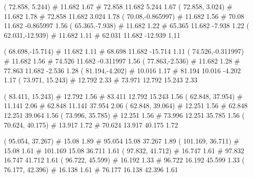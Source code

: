 \documentclass[a4paper,openbib,10pt]{article}
\newenvironment{treegraph}{\begin{graph}}{\end{graph}}
\begin{document}
\begin{treegraph}
  ( 72.858, 5.244) #     11.682    1.67
   #    72.858    11.682    5.244    1.67
  ( 72.858, 3.024) #     11.682    1.78
   #    72.858    11.682    3.024    1.78
  ( 70.08,-0.865997) #     11.682    1.56
   #    70.08    11.682    -0.865997    1.56
  ( 65.365,-7.938) #     11.682    1.22
   #    65.365    11.682    -7.938    1.22
  ( 62.031,-12.939) #     11.682    1.11
   #    62.031    11.682    -12.939    1.11

  ( 68.698,-15.714) #     11.682    1.11
   #    68.698    11.682    -15.714    1.11
  ( 74.526,-0.311997) #     11.682    1.56
   #    74.526    11.682    -0.311997    1.56
  ( 77.863,-2.536) #     11.682    1.28
   #    77.863    11.682    -2.536    1.28
  ( 81.194,-4.202) #     10.016    1.17
   #    81.194    10.016    -4.202    1.17
  ( 73.971, 15.243) #     12.792    2.33
   #    73.971    12.792    15.243    2.33

  ( 83.411, 15.243) #     12.792    1.56
   #    83.411    12.792    15.243    1.56
  ( 62.848, 37.954) #     11.141    2.06
   #    62.848    11.141    37.954    2.06
  ( 62.848, 39.064) #     12.251    1.56
   #    62.848    12.251    39.064    1.56
  ( 73.996, 35.785) #     12.251    1.56
   #    73.996    12.251    35.785    1.56
  ( 70.624, 40.175) #     13.917    1.72
   #    70.624    13.917    40.175    1.72

  ( 95.054, 37.267) #     15.08    1.89
   #    95.054    15.08    37.267    1.89
  ( 101.169, 36.711) #     15.08    1.61
   #    101.169    15.08    36.711    1.61
  ( 97.832, 41.712) #     16.747    1.61
   #    97.832    16.747    41.712    1.61
  ( 96.722, 45.599) #     16.192    1.33
   #    96.722    16.192    45.599    1.33
  ( 76.177, 42.396) #     16.138    1.61
   #    76.177    16.138    42.396    1.61


\end{treegraph}
\end{document}
